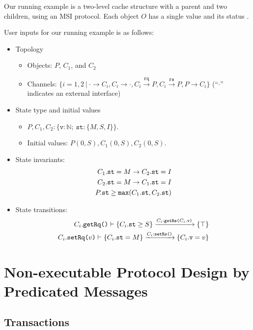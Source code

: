 \documentclass[format=manuscript]{acmart}
\begin{document}
Our running example is a two-level cache structure with a parent and two
children, using an MSI protocol. Each object $O$ has a single value 
and its status .

User inputs for our running example is as follows:

\begin{itemize}
\item Topology
  \begin{itemize}
  \item Objects: $P$, $C_1$, and $C_2$
  \item Channels: $\{ i = 1,2\ |\ \cdot \rightarrow C_i, C_i \rightarrow \cdot,
    C_i \xrightarrow{\texttt{rq}} P, C_i \xrightarrow{\texttt{rs}} P, P
    \rightarrow C_i \}$ (``$\cdot$'' indicates an external interface)
  \end{itemize}
\item State type and initial values
  \begin{itemize}
  \item $P, C_1, C_2: \{ \texttt{v}: \mathbb{N};\ \texttt{st}: \{M, S, I\} \}$.
  \item Initial values: $P(0, S), C_1(0, S), C_2(0, S)$.
  \end{itemize}
\item State invariants:
  \begin{align}
    C_1.\texttt{st} = M \to C_2.\texttt{st} = I \label{inv1} \\
    C_2.\texttt{st} = M \to C_1.\texttt{st} = I \label{inv2} \\
    P.\texttt{st} \geq \texttt{max}(C_1.\texttt{st}, C_2.\texttt{st}) \label{inv3}
  \end{align}
\item State transitions:
  \begin{eqnarray}
    C_i.\texttt{getRq()}\vdash \{ C_i.\texttt{st} \geq S \} \xrightarrow{C_i:\texttt{getRs(}C_i.\texttt{v}\texttt{)}} \{ \top \} \label{trs1} \\
    C_i.\texttt{setRq(}v\texttt{)}\vdash \{ C_i.\texttt{st} = M \} \xrightarrow{C_i:\texttt{setRs()}} \{ C_i.\texttt{v} = v \} \label{trs2}
  \end{eqnarray}
\end{itemize}

\section{Non-executable Protocol Design by Predicated Messages}

\subsection{Transactions}
\end{document}
